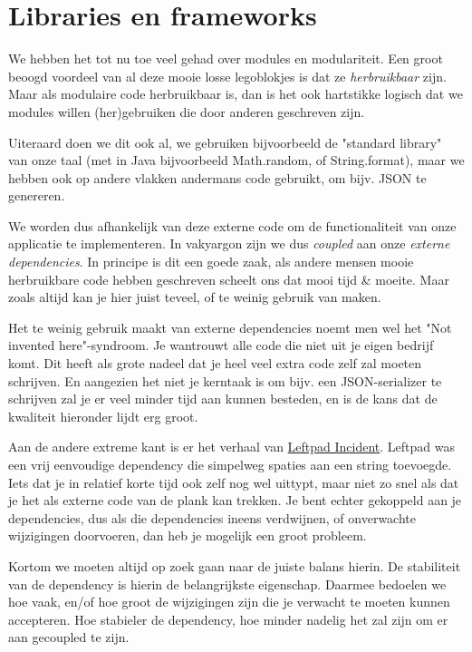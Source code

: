 \chapter{Libraries en frameworks}

We hebben het tot nu toe veel gehad over modules en modulariteit. 
Een groot beoogd voordeel van al deze mooie losse legoblokjes
is dat ze \emph{herbruikbaar} zijn. Maar als modulaire code herbruikbaar is, 
dan is het ook hartstikke logisch dat we modules willen (her)gebruiken die door anderen geschreven zijn.

Uiteraard doen we dit ook al, we gebruiken bijvoorbeeld de "standard library" van onze taal 
(met in Java bijvoorbeeld Math.random, of String.format), maar we hebben ook op andere vlakken andermans 
code gebruikt, om bijv. JSON te genereren. 

We worden dus afhankelijk van deze externe code om de functionaliteit van onze applicatie te implementeren. 
In vakyargon zijn we dus \emph{coupled} aan onze \emph{externe dependencies}. In principe is dit een goede zaak,
als andere mensen mooie herbruikbare code hebben geschreven scheelt ons dat mooi tijd \& moeite. Maar zoals
altijd kan je hier juist teveel, of te weinig gebruik van maken.

Het te weinig gebruik maakt van externe dependencies noemt men wel het "Not invented here"-syndroom. 
Je wantrouwt alle code die niet uit je eigen bedrijf komt. Dit heeft als grote nadeel dat je heel veel extra
code zelf zal moeten schrijven. En aangezien het niet je kerntaak is om bijv. een JSON-serializer te schrijven
zal je er veel minder tijd aan kunnen besteden, en is de kans dat de kwaliteit hieronder lijdt erg groot.

Aan de andere extreme kant is er het verhaal van \href{https://en.wikipedia.org/wiki/Npm_left-pad_incident}{Leftpad Incident}.
Leftpad was een vrij eenvoudige dependency die simpelweg spaties aan een string toevoegde. Iets dat je in relatief
korte tijd ook zelf nog wel uittypt, maar niet zo snel als dat je het als externe code van de plank kan trekken.
Je bent echter gekoppeld aan je dependencies, dus als die dependencies ineens verdwijnen, of onverwachte wijzigingen doorvoeren,
dan heb je mogelijk een groot probleem. 

Kortom we moeten altijd op zoek gaan naar de juiste balans hierin. De stabiliteit van de dependency is hierin
de belangrijkste eigenschap. Daarmee bedoelen we hoe vaak, en/of hoe groot de wijzigingen zijn die je verwacht
te moeten kunnen accepteren. Hoe stabieler de dependency, hoe minder nadelig het zal zijn om er aan gecoupled te zijn.

